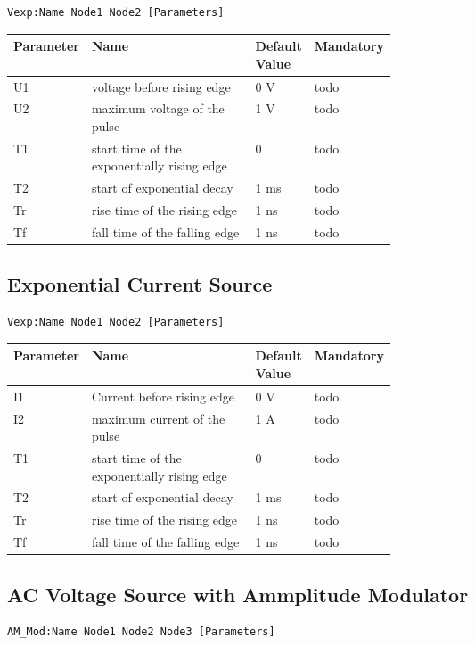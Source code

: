 \begin{verbatim}
Vexp:Name Node1 Node2 [Parameters]
\end{verbatim}


\begin{tabular}{|l|p{0.5\linewidth}|l|l|}
\hline
Parameter & Name & Default Value & Mandatory \\
\hline
U1 & voltage before rising edge & 0 V & todo \\
U2 & maximum voltage of the pulse & 1 V & todo \\
T1 & start time of the exponentially rising edge & 0 & todo \\
T2 & start of exponential decay & 1 ms & todo \\
Tr & rise time of the rising edge & 1 ns & todo \\
Tf & fall time of the falling edge & 1 ns & todo \\
\hline
\end{tabular}


\subsection{Exponential Current Source}

\begin{verbatim}
Vexp:Name Node1 Node2 [Parameters]
\end{verbatim}


\begin{tabular}{|l|p{0.5\linewidth}|l|l|}
\hline
Parameter & Name & Default Value & Mandatory \\
\hline
I1 & Current before rising edge & 0 V & todo \\
I2 & maximum current of the pulse & 1 A & todo \\
T1 & start time of the exponentially rising edge & 0 & todo \\
T2 & start of exponential decay & 1 ms & todo \\
Tr & rise time of the rising edge & 1 ns & todo \\
Tf & fall time of the falling edge & 1 ns & todo \\
\hline
\end{tabular}


\subsection{AC Voltage Source with Ammplitude Modulator}

\begin{verbatim}
AM_Mod:Name Node1 Node2 Node3 [Parameters]
\end{verbatim}

